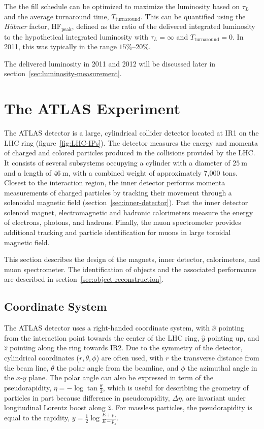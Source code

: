\begin{itemize}
	The the fill schedule can be optimized to maximize the luminosity based on $\tau_L$ and the average turnaround time, $T_{\mathrm{turnaround}}$. This can be quantified using the \emph{H{\"u}bner} factor, $\mathrm{HF}_{\mathrm{peak}}$, defined as the ratio of the delivered integrated luminosity to the hypothetical integrated luminosity with $\tau_L=\infty$ and $T_{\mathrm{turnaround}}=0$. In 2011, this was typically in the range $15\%$--$20\%$.
\end{itemize}

The delivered luminosity in 2011 and 2012 will be discussed later in section~\ref{sec:luminosity-measurement}.


\section{The ATLAS Experiment}\label{sec:the-atlas-experiment}

The ATLAS detector is a large, cylindrical collider detector located at IR1 on the LHC ring (figure~\ref{fig:LHC-IPs}). The detector measures the energy and momenta of charged and colored particles produced in the collisions provided by the LHC. It consists of several subsystems occupying a cylinder with a diameter of $25~\mbox{m}$ and a length of $46~\mbox{m}$, with a combined weight of approximately 7,000 tons. Closest to the interaction region, the inner detector performs momenta measurements of charged particles by tracking their movement through a solenoidal magnetic field (section~\ref{sec:inner-detector}). Past the inner detector solenoid magnet, electromagnetic and hadronic calorimeters measure the energy of electrons, photons, and hadrons. Finally, the muon spectrometer provides additional tracking and particle identification for muons in large toroidal magnetic field. 

This section describes the design of the magnets, inner detector, calorimeters, and muon spectrometer. The identification of objects and the associated performance are described in section~\ref{sec:object-reconstruction}. 

\subsection{Coordinate System}\label{sec:ATLAS-coordinate-system}

The ATLAS detector uses a right-handed coordinate system, with $\hat{x}$ pointing from the interaction point towards the center of the LHC ring, $\hat{y}$ pointing up, and $\hat{z}$ pointing along the ring towards IR2. Due to the symmetry of the detector, cylindrical coordinates ($r,\theta,\phi$) are often used, with $r$ the transverse distance from the beam line, $\theta$ the polar angle from the beamline, and $\phi$ the azimuthal angle in the $x$-$y$ plane. The polar angle can also be expressed in term of the pseudorapidity, $\eta = -\log \tan \frac{\theta}{2}$, which is useful for describing the geometry of particles in part because difference in pseudorapidity, $\Delta\eta$, are invariant under longitudinal Lorentz boost along $\hat{z}$. For massless particles, the pseudorapidity is equal to the rapidity, $y=\frac12 \log \frac{E+p_z}{E-p_z}$. 

